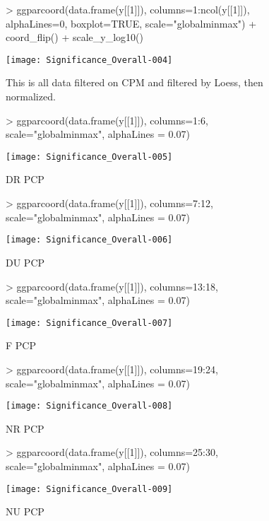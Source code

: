 \documentclass{article}
\begin{document}
\begin{figure}[H]
\centering
\begin{Schunk}
\begin{Sinput}
> ggparcoord(data.frame(y[[1]]), columns=1:ncol(y[[1]]), alphaLines=0, boxplot=TRUE, scale="globalminmax") + coord_flip() + scale_y_log10()
\end{Sinput}
\end{Schunk}
\texttt{[image: Significance\_Overall-004]}
\caption{This is all data filtered on CPM and filtered by Loess, then normalized.}
\label{Boxd2q1}
\end{figure}

\begin{figure}[H]
\centering
\begin{Schunk}
\begin{Sinput}
> ggparcoord(data.frame(y[[1]]), columns=1:6, scale="globalminmax", alphaLines = 0.07)
\end{Sinput}
\end{Schunk}
\texttt{[image: Significance\_Overall-005]}
\caption{DR PCP}
\label{Boxd2q1s}
\end{figure}

\begin{figure}[H]
\centering
\begin{Schunk}
\begin{Sinput}
> ggparcoord(data.frame(y[[1]]), columns=7:12, scale="globalminmax", alphaLines = 0.07)
\end{Sinput}
\end{Schunk}
\texttt{[image: Significance\_Overall-006]}
\caption{DU PCP}
\label{Boxd2q1s}
\end{figure}

\begin{figure}[H]
\centering
\begin{Schunk}
\begin{Sinput}
> ggparcoord(data.frame(y[[1]]), columns=13:18, scale="globalminmax", alphaLines = 0.07)
\end{Sinput}
\end{Schunk}
\texttt{[image: Significance\_Overall-007]}
\caption{F PCP}
\label{Boxd2q1s}
\end{figure}

\begin{figure}[H]
\centering
\begin{Schunk}
\begin{Sinput}
> ggparcoord(data.frame(y[[1]]), columns=19:24, scale="globalminmax", alphaLines = 0.07)
\end{Sinput}
\end{Schunk}
\texttt{[image: Significance\_Overall-008]}
\caption{NR PCP}
\label{Boxd2q1s}
\end{figure}

\begin{figure}[H]
\centering
\begin{Schunk}
\begin{Sinput}
> ggparcoord(data.frame(y[[1]]), columns=25:30, scale="globalminmax", alphaLines = 0.07)
\end{Sinput}
\end{Schunk}
\texttt{[image: Significance\_Overall-009]}
\caption{NU PCP}
\label{Boxd2q1s}
\end{figure}
\end{document}
